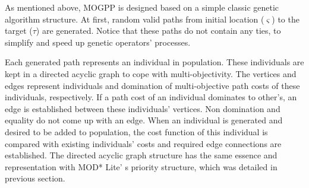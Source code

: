 \documentclass[10pt,journal]{IEEEtran}
\begin{document}


As mentioned above, MOGPP is designed based on a simple classic genetic algorithm structure. At first, random valid paths from initial location ($\varsigma$) to the target ($\tau$) are generated. Notice that these paths do not contain any ties, to simplify and speed up genetic operators' processes.

Each generated path represents an individual in population. These individuals are kept in a directed acyclic graph to cope with multi-objectivity. The vertices and edges represent individuals and domination of multi-objective path costs of these individuals, respectively. If a path cost of an individual dominates to other's, an edge is established between these individuals' vertices. Non domination and equality do not come up with an edge. When an individual is generated and desired to be added to population, the cost function of this individual is compared with existing individuals' costs and required edge connections are established. The directed acyclic graph structure has the same essence and representation with MOD* Lite' s priority structure, which was detailed in previous section.
\end{document}
